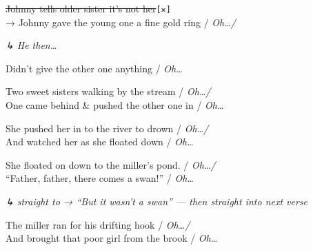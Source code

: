 \documentclass[11pt, a4paper]{article}
\newcommand{\cutline}[1]{%
  {\color{strikegray}\sout{#1}\enspace\texttt{\scriptsize[✕]}}%
}
\newenvironment{verse}%
  {\vspace{0.6em}\noindent}%
  {\vspace{0.6em}}
\newenvironment{annotation}%
  {\par\noindent\hspace{1em}\begin{minipage}{0.85\linewidth}%
   \ttfamily\small\color{annotred}\itshape ↳\enspace\ignorespaces}%
  {\end{minipage}\par}
\begin{document}
\hrulefill

\begin{verse}
\begin{bracketgroup}
\cutline{Johnny tells older sister it's not her}\\[2pt]
→ Johnny gave the young one a fine gold ring / \textit{Oh\ldots /}
\begin{annotation}
He then\ldots
\end{annotation}
Didn't give the other one anything / \textit{Oh\ldots}
\end{bracketgroup}
\end{verse}

\hrulefill

\begin{verse}
\begin{bracketgroup}
Two sweet sisters walking by the stream / \textit{Oh\ldots /}\\
One came behind \& pushed the other one in / \textit{Oh\ldots}
\end{bracketgroup}
\end{verse}

\hrulefill

\begin{verse}
\begin{bracketgroup}
She pushed her in to the river to drown / \textit{Oh\ldots /}\\
And watched her as she floated down / \textit{Oh\ldots}
\end{bracketgroup}
\end{verse}

\hrulefill

\begin{verse}
\begin{bracketgroup}
She floated on down to the miller's pond. / \textit{Oh\ldots /}\\
``Father, father, there comes a swan!'' / \textit{Oh\ldots}
\begin{annotation}
straight to → ``But it wasn't a swan'' — then straight into next verse
\end{annotation}
\end{bracketgroup}
\end{verse}

\hrulefill

\begin{verse}
\begin{bracketgroup}
The miller ran for his drifting hook / \textit{Oh\ldots /}\\
And brought that poor girl from the brook / \textit{Oh\ldots}
\end{bracketgroup}
\end{verse}
\end{document}
